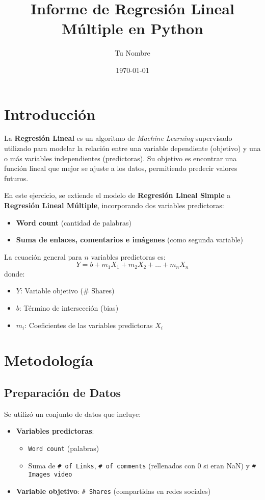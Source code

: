 \documentclass{article}
\title{Informe de Regresión Lineal Múltiple en Python}
\author{Tu Nombre}
\date{\today}
\begin{document}
\maketitle

\section{Introducción}
La \textbf{Regresión Lineal} es un algoritmo de \textit{Machine Learning} supervisado utilizado para modelar la relación entre una variable dependiente (objetivo) y una o más variables independientes (predictoras). Su objetivo es encontrar una función lineal que mejor se ajuste a los datos, permitiendo predecir valores futuros.

En este ejercicio, se extiende el modelo de \textbf{Regresión Lineal Simple} a \textbf{Regresión Lineal Múltiple}, incorporando dos variables predictoras:
\begin{itemize}
    \item \textbf{Word count} (cantidad de palabras)
    \item \textbf{Suma de enlaces, comentarios e imágenes} (como segunda variable)
\end{itemize}

La ecuación general para $n$ variables predictoras es:
\begin{equation}
    Y = b + m_1 X_1 + m_2 X_2 + \dots + m_n X_n
    \label{eq:regresion}
\end{equation}
donde:
\begin{itemize}
    \item $Y$: Variable objetivo (\# Shares)
    \item $b$: Término de intersección (bias)
    \item $m_i$: Coeficientes de las variables predictoras $X_i$
\end{itemize}

\section{Metodología}
\subsection{Preparación de Datos}
Se utilizó un conjunto de datos que incluye:
\begin{itemize}
    \item \textbf{Variables predictoras}:
    \begin{itemize}
        \item \texttt{Word count} (palabras)
        \item Suma de \texttt{\# of Links}, \texttt{\# of comments} (rellenados con 0 si eran NaN) y \texttt{\# Images video}
    \end{itemize}
    \item \textbf{Variable objetivo}: \texttt{\# Shares} (compartidas en redes sociales)
\end{itemize}
\end{document}
